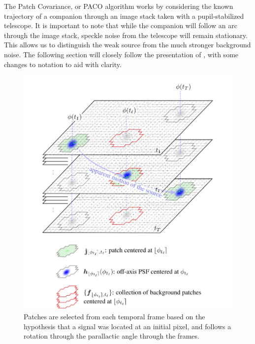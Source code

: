 \documentclass[twocolumn,fleqn]{aastex62}
\begin{document}
The Patch Covariance, or PACO algorithm works by considering the known trajectory of a companion through an image stack taken with a pupil-stabilized telescope. 
It is important to note that while the companion will follow an arc through the image stack, speckle noise from the telescope will remain stationary. 
This allows us to distinguish the weak source from the much stronger background noise.
The following section will closely follow the presentation of \cite{PACO}, with some changes to notation to aid with clarity. 

\begin{figure}[h]
	\centering
	\includegraphics[width=\linewidth]{figures/PacoVis.png}
	\caption{\label{fig:patches} Patches are selected from each temporal frame based on the hypothesis that a signal was located at an initial pixel, and follows a rotation through the parallactic angle through the frames.}
\end{figure}
\end{document}
